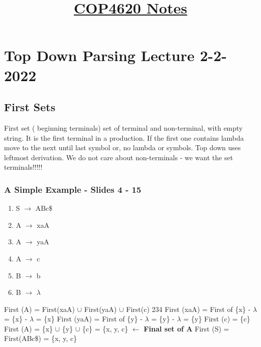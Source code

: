 \documentclass{report}
\title{\vspace{-50pt}\textbf{\underline{COP4620 Notes}}}
\author{}
\date{}
\begin{document}
\maketitle
\tableofcontents

\chapter{Top Down Parsing Lecture 2-2-2022}

\section{First Sets}
First set ( beginning terminals) set of terminal and non-terminal, with empty string.
It is the first terminal in a production. If the first one contains lambda move to the next until last symbol or, no lambda or symbols. Top down uses leftmost derivation. We do not care about non-terminals - we want the set terminals!!!!!

\subsection{A Simple Example - Slides 4 - 15}
\vspace{-1.5em}
\begin{multicols}{2}
  \begin{enumerate}
    \setlength\itemsep{-.25em}
    \item S $\rightarrow$ ABc\$
    \item A $\rightarrow$ xaA
    \item A $\rightarrow$ yaA
    \item A $\rightarrow$ c
    \item B $\rightarrow$ b
    \item B $\rightarrow$ $\lambda$\newline
  \end{enumerate}
  \setlength{\leftskip}{-12em}
  First (A) = First(xaA) $\cup$ First(yaA) $\cup$ First(c)\newline
  \indent\hspace{2cm}2\hspace{5.5em}3\hspace{5.5em}4\newline
  \indent\hspace{.25cm}First (xaA) = First of \{x\} - $\lambda$ = \{x\} - $\lambda$ = \{x\}\newline
  \indent\hspace{.25cm}First (yaA) = First of \{y\} - $\lambda$ = \{y\} - $\lambda$ = \{y\}\newline
  \indent\hspace{.25cm}First (c) = \{c\}\newline
  First (A) = \{x\} $\cup$ \{y\} $\cup$ \{c\} = \{x, y, c\} $\leftarrow$ \textbf{Final set of A}\newline
  First (S) = First(ABc\$) = \{x, y, c\}
  \\
\end{multicols}
\end{document}
